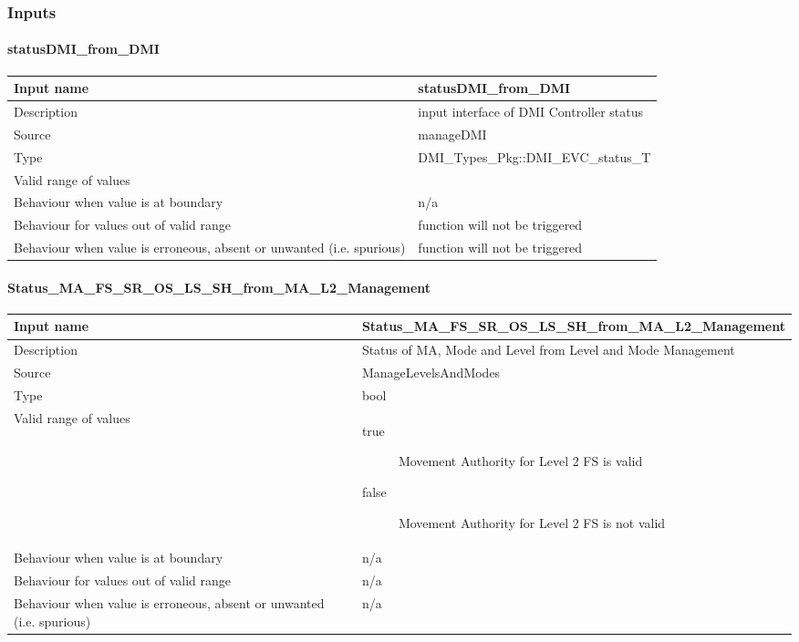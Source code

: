 \subsubsection{Inputs}\label{s:etcs_procedures_inputs}

\paragraph{statusDMI\_from\_DMI}

\begin{longtable}{p{}p{}}
\toprule
Input name				& statusDMI\_from\_DMI \\
\midrule
Description				& input interface of DMI Controller status \\
\midrule
Source					& manageDMI  \\ 
\midrule
Type					& DMI\_Types\_Pkg::DMI\_EVC\_status\_T \\
\midrule
Valid range of values	& \todo[inline]{To be completed} \\
\midrule
Behaviour when value is at boundary	& n/a \\
\midrule
Behaviour for values out of valid range	& function will not be triggered  \\
\midrule
Behaviour when value is erroneous, absent or unwanted (i.e. spurious) & function will not be triggered \\
\bottomrule
\end{longtable}


\paragraph{Status\_MA\_FS\_SR\_OS\_LS\_SH\_from\_MA\_L2\_Management}

\begin{longtable}{p{}p{}}
\toprule
Input name				& Status\_MA\_FS\_SR\_OS\_LS\_SH\_from\_MA\_L2\_Management \\
\midrule
Description				& Status of MA, Mode and Level from Level and Mode Management \\
\midrule
Source					& ManageLevelsAndModes \\ 
\midrule
Type					& bool \\
\midrule
Valid range of values	& \begin{description}
\item[true]Movement Authority for Level 2 FS is valid
\item[false]Movement Authority for Level 2 FS is not valid
\end{description} \\
\midrule
Behaviour when value is at boundary	& n/a \\
\midrule
Behaviour for values out of valid range	& n/a \\
\midrule
Behaviour when value is erroneous, absent or unwanted (i.e. spurious) & n/a \\
\bottomrule
\end{longtable}


